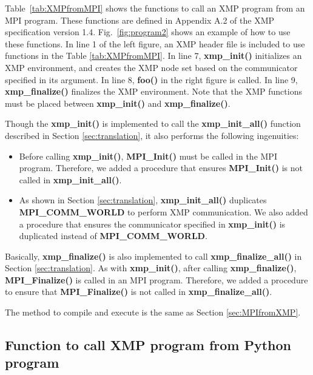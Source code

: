 \documentclass[graybox]{svmult}
\begin{document}
Table~\ref{tab:XMPfromMPI} shows the functions to call an XMP program from an MPI program.
These functions are defined in Appendix A.2 of the XMP specification version 1.4\cite{xmp-spec}.
Fig.~\ref{fig:program2} shows an example of how to use these functions. 
In line 1 of the left figure,
an XMP header file is included to use functions in the Table \ref{tab:XMPfromMPI}.
In line 7,  {\bf xmp\_init()} initializes an XMP environment,
and creates the XMP node set based on the communicator specified in its argument.
In line 8,
 {\bf foo()}  in the right figure is called.
In line 9,  {\bf xmp\_finalize()} finalizes the XMP environment.
Note that the XMP functions must be placed between  {\bf xmp\_init()} and {\bf xmp\_finalize()}.

Though the {\bf xmp\_init()} is implemented to call the {\bf xmp\_init\_all()} function described in Section \ref{sec:translation},
it also performs the following ingenuities:

\begin{itemize}
\item Before calling {\bf xmp\_init()}, {\bf MPI\_Init()} must be called in the MPI program.
Therefore, we added a procedure that ensures  {\bf MPI\_Init()} is not called in  {\bf xmp\_init\_all()}.
\item As shown in Section \ref{sec:translation},  {\bf xmp\_init\_all()} duplicates {\bf MPI\_COMM\_WORLD} to perform XMP communication.
We also added a procedure that ensures the communicator specified in  {\bf xmp\_init()} is duplicated instead of {\bf MPI\_COMM\_WORLD}.
\end{itemize}

Basically, {\bf xmp\_finalize()} is also implemented to call  {\bf xmp\_finalize\_all()}  in Section \ref{sec:translation}.
As with  {\bf xmp\_init()},
after calling  {\bf xmp\_finalize()}, {\bf MPI\_Finalize()}  is called in an MPI program.
Therefore,
we added a procedure to ensure that  {\bf MPI\_Finalize()} is not called in  {\bf xmp\_finalize\_all()}.

The method to compile and execute is the same as Section \ref{sec:MPIfromXMP}.

\subsection{Function to call XMP program from Python program}
\end{document}
